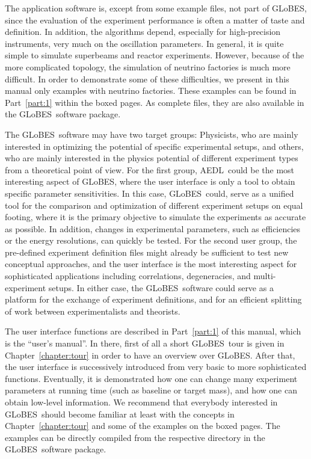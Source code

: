 \documentclass[a4paper,12pt,twoside]{book}
\newcommand{\Chapt}{Chapter}
\newcommand{\Part}{Part}
\newcommand{\GLOBES}{{\sf GLoBES}}
\newcommand{\AEDL}{{\sf AEDL}}
\begin{document}
The application 
software is, except from some example files, not part of \GLOBES , since
the evaluation of the experiment performance is often a matter of taste
and definition. In addition, the algorithms depend, especially for
high-precision instruments, very much on the oscillation parameters.
In general, it is quite simple to simulate superbeams and reactor
experiments. However, because of the more complicated topology, the
simulation of neutrino factories is much more difficult. In order
to demonstrate some of these difficulties, we present in this manual only
examples with neutrino factories. These examples can be found in
\Part~\ref{part:1} within the boxed pages. As complete files, they
are also available in the \GLOBES\ software package.

The \GLOBES\ software may have two target groups: 
Physicists, who are mainly interested in optimizing the potential
of specific experimental setups, and others, who are mainly
interested in the physics potential of different experiment types
from a theoretical point of view.
For the first group, \AEDL\ could be the most interesting aspect of
\GLOBES , where the user interface is only a tool to obtain specific
parameter sensitivities. In this case, \GLOBES\ could, serve as a
unified tool for the comparison and optimization of different experiment
 setups on equal footing, where
it is the primary objective to simulate the experiments as accurate
as possible. In addition, changes in experimental parameters, such as
efficiencies or the energy resolutions, can quickly be tested.
%
For the second user group, the pre-defined 
experiment definition files might already be sufficient to test
new conceptual approaches, and the user interface is the most interesting
aspect for sophisticated applications including correlations,
degeneracies, and multi-experiment setups. In either case, the \GLOBES\
software could serve as a platform for the exchange of experiment
definitions, and for an efficient splitting of work between
experimentalists and theorists.

The user interface functions are described in \Part~\ref{part:1} of 
this manual, which is the ``user's manual''. In there, first of all a 
short \GLOBES\ tour is given in \Chapt~\ref{chapter:tour} in order to 
have an overview over \GLOBES .
After that, the user
interface is successively introduced from very basic to more sophisticated
functions. Eventually, it is demonstrated how one can change many
experiment parameters at running time (such as baseline or target mass), and how one can obtain low-level
information. We recommend that everybody interested in \GLOBES\ should
become familiar at least with the concepts in \Chapt~\ref{chapter:tour}
 and some of the examples on the boxed pages. The examples can be 
 directly compiled 
 from the respective directory in the \GLOBES\ software package.
\end{document}
